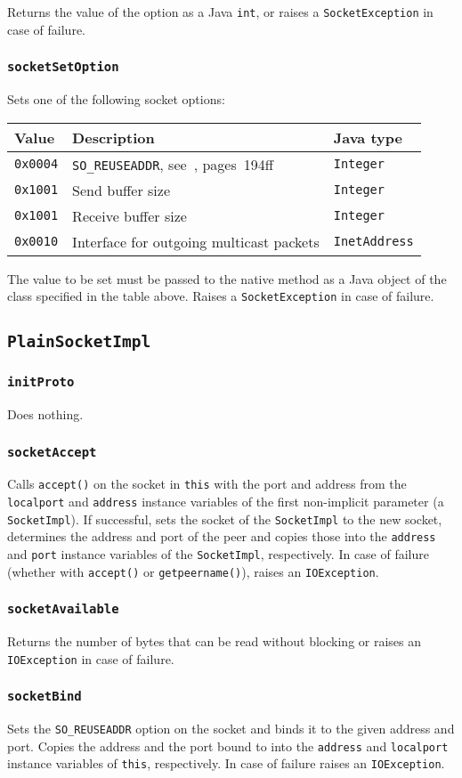 \documentclass[twocolumn,a4paper]{article}      %
\newcommand{\class}[1]{\subsection{\texttt{#1}}}
\newcommand{\method}[1]{\subsubsection*{\texttt{#1}}}
\begin{document}
Returns the value of the option as a Java \texttt{int}, or raises a
\texttt{SocketException} in case of failure.

\method{socketSetOption}

Sets one of the following socket options:

\medskip
\begin{tabular}{|l|p{3cm}|l|} \hline
Value           & Description & Java type \\ \hline
\texttt{0x0004} & \texttt{SO\_REUSEADDR}, see~\cite{stevens1}, pages~194ff & \texttt{Integer} \\
\texttt{0x1001} & Send buffer size & \texttt{Integer} \\
\texttt{0x1001} & Receive buffer size & \texttt{Integer} \\
\texttt{0x0010} & Interface for outgoing multicast packets & \texttt{InetAddress} \\ \hline
\end{tabular}
\medskip

The value to be set must be passed to the native method as a Java
object of the class specified in the table above. Raises a
\texttt{SocketException} in case of failure.

\class{PlainSocketImpl}

\method{initProto}

Does nothing.

\method{socketAccept}

Calls \texttt{accept()} on the socket in \texttt{this} with the port
and address from the \texttt{localport} and \texttt{address} instance
variables of the first non-implicit parameter (a
\texttt{SocketImpl}). If successful, sets the socket of the
\texttt{SocketImpl} to the new socket, determines the address and port
of the peer and copies those into the \texttt{address} and
\texttt{port} instance variables of the \texttt{SocketImpl},
respectively. In case of failure (whether with \texttt{accept()} or
\texttt{getpeername()}), raises an \texttt{IOException}.

\method{socketAvailable}

Returns the number of bytes that can be read without blocking or
raises an \texttt{IOException} in case of failure.

\method{socketBind}

Sets the \texttt{SO\_REUSEADDR} option on the socket and binds it to
the given address and port. Copies the address and the port bound to
into the \texttt{address} and \texttt{localport} instance variables of
\texttt{this}, respectively. In case of failure raises an
\texttt{IOException}.
\end{document}
